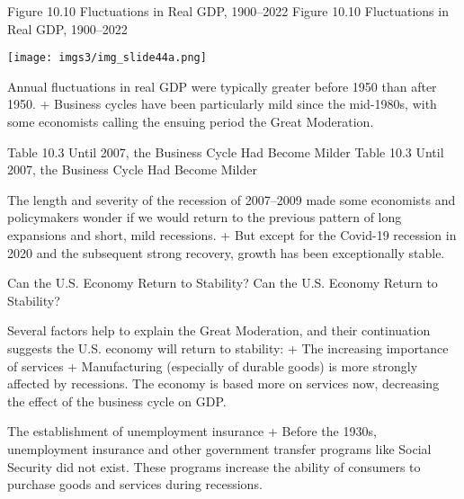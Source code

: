 \documentclass[
  12pt,
  ignorenonframetext,
]{beamer}
\begin{document}
\begin{frame}{Figure 10.10 Fluctuations in Real GDP, 1900--2022}
\protect\hypertarget{figure-10.10-fluctuations-in-real-gdp-19002022}{}
Figure 10.10 Fluctuations in Real GDP, 1900--2022

\texttt{[image: imgs3/img\_slide44a.png]}

Annual fluctuations in real GDP were typically greater before 1950 than
after 1950. + Business cycles have been particularly mild since the
mid-1980s, with some economists calling the ensuing period the Great
Moderation.
\end{frame}

\begin{frame}{Table 10.3 Until 2007, the Business Cycle Had Become
Milder}
\protect\hypertarget{table-10.3-until-2007-the-business-cycle-had-become-milder}{}
Table 10.3 Until 2007, the Business Cycle Had Become Milder

The length and severity of the recession of 2007--2009 made some
economists and policymakers wonder if we would return to the previous
pattern of long expansions and short, mild recessions. + But except for
the Covid-19 recession in 2020 and the subsequent strong recovery,
growth has been exceptionally stable.
\end{frame}

\begin{frame}{Can the U.S. Economy Return to Stability?}
\protect\hypertarget{can-the-u.s.-economy-return-to-stability}{}
Can the U.S. Economy Return to Stability?

Several factors help to explain the Great Moderation, and their
continuation suggests the U.S. economy will return to stability: + The
increasing importance of services + Manufacturing (especially of durable
goods) is more strongly affected by recessions. The economy is based
more on services now, decreasing the effect of the business cycle on
GDP.

The establishment of unemployment insurance + Before the 1930s,
unemployment insurance and other government transfer programs like
Social Security did not exist. These programs increase the ability of
consumers to purchase goods and services during recessions.
\end{frame}
\end{document}
